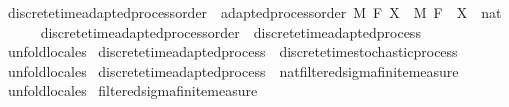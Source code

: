 \begin{isabellebody}
\isamarkupfalse%
\ discrete{\isacharunderscore}{\kern0pt}time{\isacharunderscore}{\kern0pt}adapted{\isacharunderscore}{\kern0pt}process{\isacharunderscore}{\kern0pt}order\ {\isacharequal}{\kern0pt}\ adapted{\isacharunderscore}{\kern0pt}process{\isacharunderscore}{\kern0pt}order\ M\ F\ X\ \ M\ F\ \ X\ {\isacharcolon}{\kern0pt}{\isacharcolon}{\kern0pt}\ {\isachardoublequoteopen}nat\ {\isasymRightarrow}\ {\isacharunderscore}{\kern0pt}\ {\isasymRightarrow}\ {\isacharunderscore}{\kern0pt}{\isachardoublequoteclose}\isanewline
\isanewline
{}\isamarkupfalse%
\ discrete{\isacharunderscore}{\kern0pt}time{\isacharunderscore}{\kern0pt}adapted{\isacharunderscore}{\kern0pt}process{\isacharunderscore}{\kern0pt}order\ {\isasymsubseteq}\ discrete{\isacharunderscore}{\kern0pt}time{\isacharunderscore}{\kern0pt}adapted{\isacharunderscore}{\kern0pt}process%
\isadelimproof
\ %
\endisadelimproof
%
\isatagproof
{}\isamarkupfalse%
\ {\isacharparenleft}{\kern0pt}unfold{\isacharunderscore}{\kern0pt}locales{\isacharparenright}{\kern0pt}%
\endisatagproof
{\isafoldproof}%
%
\isadelimproof
%
\endisadelimproof
\isanewline
{}\isamarkupfalse%
\ discrete{\isacharunderscore}{\kern0pt}time{\isacharunderscore}{\kern0pt}adapted{\isacharunderscore}{\kern0pt}process\ {\isasymsubseteq}\ discrete{\isacharunderscore}{\kern0pt}time{\isacharunderscore}{\kern0pt}stochastic{\isacharunderscore}{\kern0pt}process%
\isadelimproof
\ %
\endisadelimproof
%
\isatagproof
{}\isamarkupfalse%
\ {\isacharparenleft}{\kern0pt}unfold{\isacharunderscore}{\kern0pt}locales{\isacharparenright}{\kern0pt}%
\endisatagproof
{\isafoldproof}%
%
\isadelimproof
%
\endisadelimproof
\isanewline
{}\isamarkupfalse%
\ discrete{\isacharunderscore}{\kern0pt}time{\isacharunderscore}{\kern0pt}adapted{\isacharunderscore}{\kern0pt}process\ {\isasymsubseteq}\ nat{\isacharunderscore}{\kern0pt}filtered{\isacharunderscore}{\kern0pt}sigma{\isacharunderscore}{\kern0pt}finite{\isacharunderscore}{\kern0pt}measure%
\isadelimproof
\ %
\endisadelimproof
%
\isatagproof
{}\isamarkupfalse%
\ {\isacharparenleft}{\kern0pt}unfold{\isacharunderscore}{\kern0pt}locales{\isacharparenright}{\kern0pt}%
\endisatagproof
{\isafoldproof}%
%
\isadelimproof
%
\endisadelimproof
\isanewline
\isanewline
{}\isamarkupfalse%
\ filtered{\isacharunderscore}{\kern0pt}sigma{\isacharunderscore}{\kern0pt}finite{\isacharunderscore}{\kern0pt}measure\isanewline
{}\isanewline
\isanewline
{}\isamarkupfalse%

\end{isabellebody}
